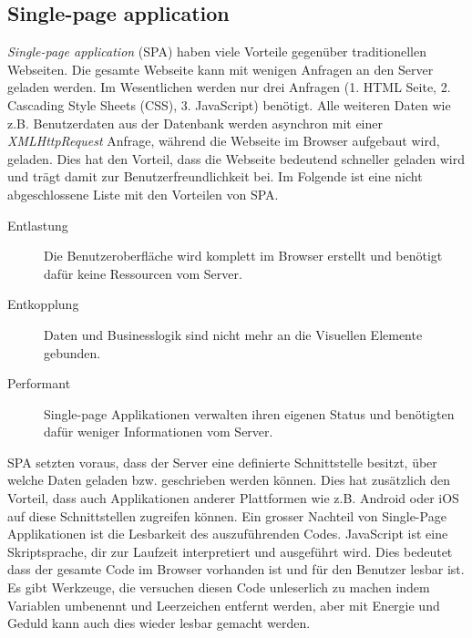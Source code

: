 \subsection{Single-page application}
\textit{Single-page application} (SPA) haben viele Vorteile gegenüber traditionellen Webseiten. Die gesamte Webseite kann mit wenigen Anfragen an den Server geladen werden. Im Wesentlichen werden nur drei Anfragen (1. HTML Seite, 2. Cascading Style Sheets (CSS), 3. JavaScript) benötigt. Alle weiteren Daten wie z.B. Benutzerdaten aus der Datenbank werden asynchron mit einer \textit{XMLHttpRequest} Anfrage, während die Webseite im Browser aufgebaut wird, geladen. Dies hat den Vorteil, dass die Webseite bedeutend schneller geladen wird und trägt damit zur Benutzerfreundlichkeit bei. Im Folgende ist eine nicht abgeschlossene Liste mit den Vorteilen von SPA.
\begin{description}
	\item[Entlastung] Die Benutzeroberfläche wird komplett im Browser erstellt und benötigt dafür keine Ressourcen vom Server.
	\item[Entkopplung] Daten und Businesslogik sind nicht mehr an die Visuellen Elemente gebunden.
	\item[Performant] Single-page Applikationen verwalten ihren eigenen Status und benötigten dafür weniger Informationen vom Server.
\end{description}
SPA setzten voraus, dass der Server eine definierte Schnittstelle besitzt, über welche Daten geladen bzw. geschrieben werden können. Dies hat zusätzlich den Vorteil, dass auch Applikationen anderer Plattformen wie z.B. Android oder iOS auf diese Schnittstellen zugreifen können.
\newline{}
Ein grosser Nachteil von Single-Page Applikationen ist die Lesbarkeit des auszuführenden Codes. JavaScript ist eine Skriptsprache, dir zur Laufzeit interpretiert und ausgeführt wird. Dies bedeutet dass der gesamte Code im Browser vorhanden ist und für den Benutzer lesbar ist. Es gibt Werkzeuge, die versuchen diesen Code unleserlich zu machen indem Variablen umbenennt und Leerzeichen entfernt werden, aber mit Energie und Geduld kann auch dies wieder lesbar gemacht werden.

